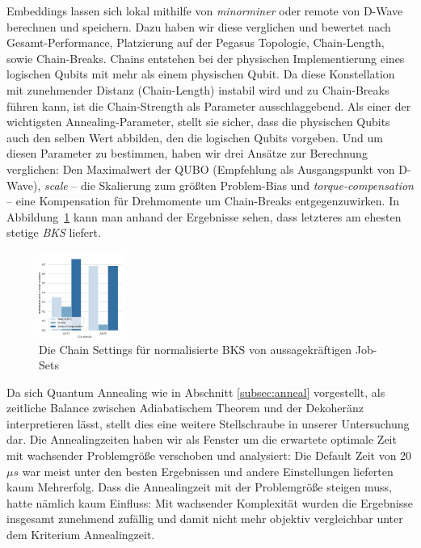 Embeddings lassen sich lokal mithilfe  von \textit{minorminer} \cite{Parameter2021} oder remote von D-Wave berechnen und speichern. Dazu haben wir diese verglichen und bewertet nach Gesamt-Performance, Platzierung auf der Pegasus Topologie, Chain-Length, sowie Chain-Breaks. 
Chains entstehen bei der physischen Implementierung eines logischen Qubits mit mehr als einem physischen Qubit. Da diese Konstellation mit zunehmender Distanz (Chain-Length) instabil wird und zu Chain-Breaks führen kann, ist die Chain-Strength als Parameter ausschlaggebend. Als einer der wichtigsten Annealing-Parameter,  stellt sie sicher, dass die physischen Qubits auch den selben Wert abbilden, den die logischen Qubits vorgeben.
Und um diesen Parameter zu bestimmen, haben wir drei Ansätze zur Berechnung verglichen:  Den Maximalwert der QUBO (Empfehlung als Ausgangspunkt von D-Wave), \textit{scale} -- die Skalierung zum größten Problem-Bias und \textit{torque-compensation} -- eine Kompensation für Drehmomente um Chain-Breaks entgegenzuwirken. In Abbildung~\ref{fig:SettingsBKS} kann man anhand der Ergebnisse sehen, dass letzteres am ehesten stetige \textit{BKS} liefert.\\
\begin{figure}
  \centering
  \includegraphics[trim={0.3cm 0.45cm 0.3cm 0.3cm}, clip, width=0.25\textwidth]{images/Chain SettingsBKS}
  \caption{Die Chain Settings für normalisierte BKS von aussagekräftigen Job-Sets}
      \label{fig:SettingsBKS}
      \vspace{-12pt} 
      \end{figure}
Da sich Quantum Annealing wie in Abschnitt \ref{subsec:anneal} vorgestellt, als zeitliche Balance zwischen Adiabatischem Theorem und der Dekoheränz interpretieren lässt, stellt dies eine weitere Stellschraube in unserer Untersuchung dar.  Die Annealingzeiten haben wir als Fenster um die erwartete optimale Zeit mit wachsender Problemgröße verschoben und analysiert: Die Default Zeit von 20$\mu s$ war meist unter den besten Ergebnissen und andere Einstellungen lieferten kaum Mehrerfolg. Dass die Annealingzeit  mit der Problemgröße steigen muss, hatte nämlich kaum Einfluss: Mit wachsender Komplexität wurden die Ergebnisse insgesamt zunehmend zufällig und damit nicht mehr objektiv vergleichbar unter dem Kriterium Annealingzeit.
